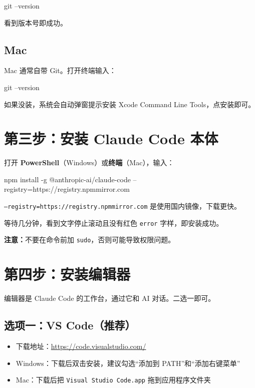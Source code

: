 \documentclass[12pt,a4paper]{ctexart}
\begin{document}
\begin{shcode}
git --version
\end{shcode}

看到版本号即成功。

\subsection{Mac}

Mac 通常自带 Git。打开终端输入：

\begin{shcode}
git --version
\end{shcode}

如果没装，系统会自动弹窗提示安装 Xcode Command Line Tools，点安装即可。

\section{第三步：安装 Claude Code 本体}

打开 \textbf{PowerShell}（Windows）或\textbf{终端}（Mac），输入：

\begin{shcode}
npm install -g @anthropic-ai/claude-code --registry=https://registry.npmmirror.com
\end{shcode}

\texttt{--registry=https://registry.npmmirror.com} 是使用国内镜像，下载更快。

等待几分钟，看到文字停止滚动且没有红色 \texttt{error} 字样，即安装成功。

\textbf{注意：}不要在命令前加 \texttt{sudo}，否则可能导致权限问题。

\section{第四步：安装编辑器}

编辑器是 Claude Code 的工作台，通过它和 AI 对话。二选一即可。

\subsection{选项一：VS Code（推荐）}

\begin{itemize}[nosep]
    \item 下载地址：\url{https://code.visualstudio.com/}
    \item Windows：下载后双击安装，建议勾选``添加到 PATH''和``添加右键菜单''
    \item Mac：下载后把 \texttt{Visual Studio Code.app} 拖到应用程序文件夹
\end{itemize}
\end{document}
